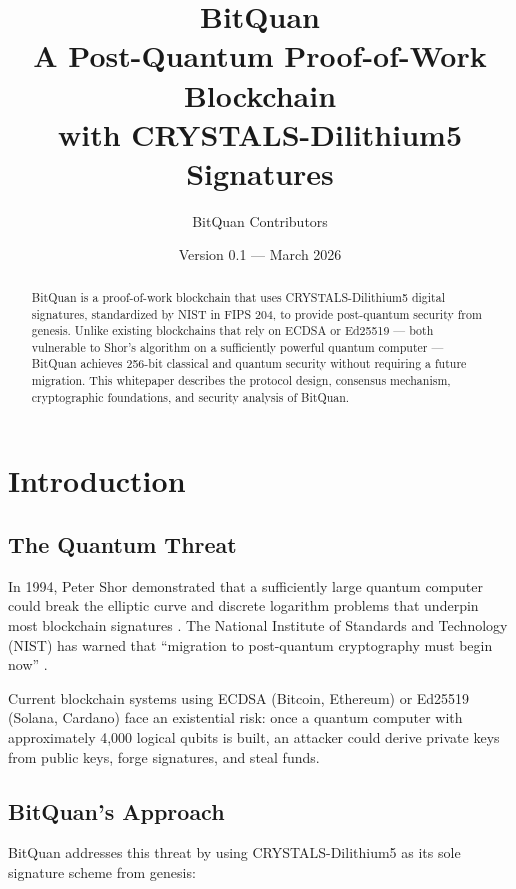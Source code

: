\documentclass[11pt,a4paper]{article}
\title{\textbf{BitQuan}\\[0.5em]
\large A Post-Quantum Proof-of-Work Blockchain\\
with CRYSTALS-Dilithium5 Signatures}
\author{BitQuan Contributors}
\date{Version 0.1 — March 2026}
\begin{document}
\maketitle
\thispagestyle{empty}

\begin{abstract}
BitQuan is a proof-of-work blockchain that uses CRYSTALS-Dilithium5 digital signatures, standardized by NIST in FIPS 204, to provide post-quantum security from genesis. Unlike existing blockchains that rely on ECDSA or Ed25519 — both vulnerable to Shor's algorithm on a sufficiently powerful quantum computer — BitQuan achieves 256-bit classical and quantum security without requiring a future migration. This whitepaper describes the protocol design, consensus mechanism, cryptographic foundations, and security analysis of BitQuan.
\end{abstract}

\tableofcontents
\newpage

\section{Introduction}

\subsection{The Quantum Threat}

In 1994, Peter Shor demonstrated that a sufficiently large quantum computer could break the elliptic curve and discrete logarithm problems that underpin most blockchain signatures \cite{shor1994}. The National Institute of Standards and Technology (NIST) has warned that ``migration to post-quantum cryptography must begin now'' \cite{nist2024}.

Current blockchain systems using ECDSA (Bitcoin, Ethereum) or Ed25519 (Solana, Cardano) face an existential risk: once a quantum computer with approximately 4,000 logical qubits is built, an attacker could derive private keys from public keys, forge signatures, and steal funds.

\subsection{BitQuan's Approach}

BitQuan addresses this threat by using CRYSTALS-Dilithium5 \cite{dilithium2024} as its sole signature scheme from genesis:
\end{document}
